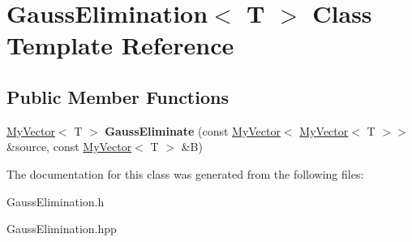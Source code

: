 \hypertarget{class_gauss_elimination}{}\section{Gauss\+Elimination$<$ T $>$ Class Template Reference}
\label{class_gauss_elimination}
\subsection*{Public Member Functions}
\begin{DoxyCompactItemize}
\item 
\mbox{\label{class_gauss_elimination_af4df02b15566a600f527788332deaefa}} 
\mbox{\hyperlink{class_my_vector}{My\+Vector}}$<$ T $>$ {\bfseries Gauss\+Eliminate} (const \mbox{\hyperlink{class_my_vector}{My\+Vector}}$<$ \mbox{\hyperlink{class_my_vector}{My\+Vector}}$<$ T $>$$>$ \&source, const \mbox{\hyperlink{class_my_vector}{My\+Vector}}$<$ T $>$ \&B)
\end{DoxyCompactItemize}


The documentation for this class was generated from the following files\+:\begin{DoxyCompactItemize}
\item 
Gauss\+Elimination.\+h\item 
Gauss\+Elimination.\+hpp\end{DoxyCompactItemize}
